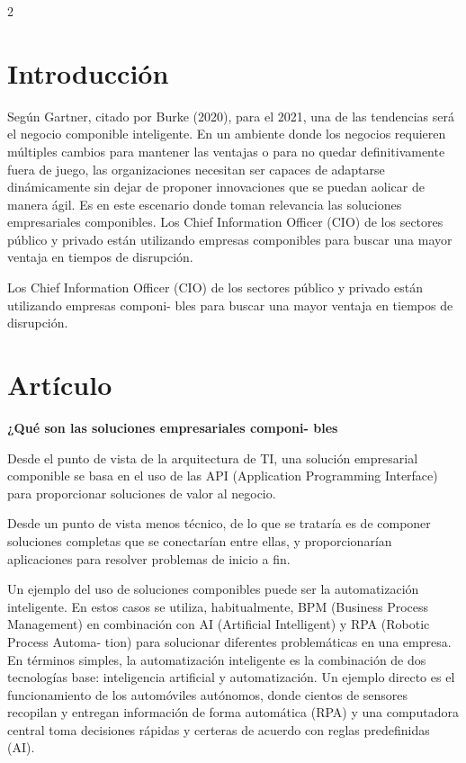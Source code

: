 \documentclass[12pt,spanish,Letterpaper,openany]{book}
\begin{document}
\begin {multicols}{2}
{\section{Introducción}\label{introducciuxf3n}}

Según Gartner, citado por Burke (2020), para el 2021, una de las tendencias será el negocio componible inteligente. En un ambiente donde los negocios requieren múltiples cambios para mantener las ventajas o para no quedar definitivamente fuera de juego, las organizaciones necesitan ser capaces de adaptarse dinámicamente sin dejar de proponer innovaciones que se puedan aolicar de manera ágil. Es en este escenario donde toman relevancia las soluciones empresariales componibles.
Los Chief Information Officer (CIO) de los sectores público y privado están utilizando empresas componibles para buscar una mayor ventaja en tiempos de disrupción.

Los Chief Information Officer (CIO) de los sectores público y privado están utilizando empresas componi-
bles para buscar una mayor ventaja en tiempos de disrupción.

\hypertarget{artuxedculo}{%
\section{Artículo}\label{artuxedculo}}

\textbf{¿Qué son las soluciones empresariales componi-
bles}

Desde el punto de vista de la arquitectura de TI, una solución empresarial componible se basa en el uso de las API (Application Programming Interface) para proporcionar soluciones de valor al negocio.

Desde un punto de vista menos técnico, de lo que se trataría es de componer soluciones completas que se conectarían entre ellas, y proporcionarían aplicaciones para resolver problemas de inicio a fin.

Un ejemplo del uso de soluciones componibles puede ser la automatización inteligente. En estos casos se utiliza, habitualmente, BPM (Business Process Management) en combinación con AI (Artificial Intelligent) y RPA (Robotic Process Automa-
tion) para solucionar diferentes problemáticas en una empresa.
En términos simples, la automatización inteligente es la combinación de dos tecnologías base: inteligencia artificial y automatización. Un ejemplo directo es el funcionamiento de los automóviles autónomos, donde cientos de sensores recopilan y entregan información de forma automática (RPA) y una computadora central toma decisiones rápidas y certeras de acuerdo con reglas predefinidas (AI).


\end{multicols}
\end{document}
